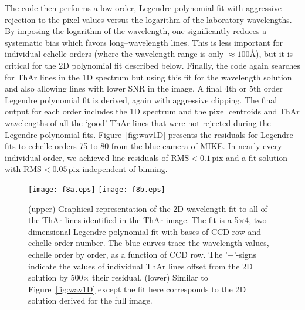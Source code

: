 \documentclass[]{emulateapj}
\begin{document}
The code then performs a low order, Legendre polynomial
fit with aggressive rejection
to the pixel values versus the logarithm of the laboratory
wavelengths.  By imposing the logarithm of the wavelength, 
one significantly reduces a systematic bias 
which favors long--wavelength lines.
This is less important for individual echelle 
orders (where the wavelength range is only
$\approx 100$\AA), but it is critical for the 2D polynomial
fit described below.
Finally, the code again searches for ThAr lines in the 1D
spectrum but using this fit for the wavelength solution and also
allowing lines with lower SNR in the image.  A final 4th or 5th
order Legendre polynomial fit is derived, again with aggressive
clipping.  The final output for each order
includes the 1D spectrum and the pixel centroids and ThAr wavelengths
of all the `good' ThAr lines that were not rejected during
the Legendre polynomial fits.
Figure~\ref{fig:wav1D} presents the residuals for Legendre
fits to echelle orders 75 to 80 from the blue camera of MIKE.
In nearly every individual order, we achieved line residuals 
of RMS$<0.1$\,pix
and a fit solution with RMS$<0.05$\,pix independent of binning.


\begin{figure}
\texttt{[image: f8a.eps]}
\texttt{[image: f8b.eps]}
\caption{(upper) Graphical representation of the 2D wavelength
fit to all of the ThAr lines identified in the ThAr image.
The fit is a 5$\times$4, two-dimensional Legendre polynomial
fit with bases of CCD row and echelle order number.
The blue curves trace the wavelength values, echelle order by
order, as a function of CCD row.  The '+'-signs indicate
the values of individual ThAr lines offset from the 2D solution
by 500$\times$ their residual.
(lower)  Similar to Figure~\ref{fig:wav1D} except the fit here
corresponds to the 2D solution derived for the full image.
}
\label{fig:wav2D}
\end{figure}
\end{document}
